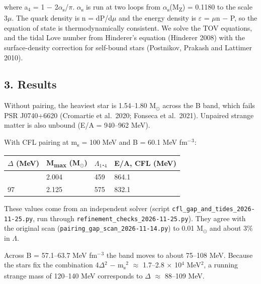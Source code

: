 \documentclass[
  11pt,
]{article}
\begin{document}
where a\ensuremath{_{4}} = 1 \ensuremath{-} 2\ensuremath{\alpha}\textsubscript{s}/\ensuremath{\pi}. \ensuremath{\alpha}\textsubscript{s} is run at two loops from \ensuremath{\alpha}\textsubscript{s}(M\textsubscript{Z}) = 0.1180 to the scale 3\ensuremath{\mu}. The quark density is n = dP/d\ensuremath{\mu} and the energy density is \ensuremath{\varepsilon} = \ensuremath{\mu}n \ensuremath{-} P, so the equation of state is thermodynamically consistent. We solve the TOV equations, and the tidal Love number from Hinderer's equation (Hinderer 2008) with the surface-density correction for self-bound stars (Postnikov, Prakash and Lattimer 2010).

\hypertarget{results}{%
\subsection{3. Results}\label{results}}

Without pairing, the heaviest star is 1.54--1.80 M\ensuremath{_{\odot}} across the B band, which fails PSR J0740+6620 (Cromartie et al.~2020; Fonseca et al.~2021). Unpaired strange matter is also unbound (E/A = 940--962 MeV).

With CFL pairing at m\textsubscript{s} = 100 MeV and B = 60.1 MeV fm\ensuremath{^{-}}\ensuremath{^{3}}:

\begin{longtable}[]{@{}llll@{}}
\toprule\noalign{}
\ensuremath{\Delta} (MeV) & M\textsubscript{max} (M\ensuremath{_{\odot}}) & \ensuremath{\Lambda}\ensuremath{_{1}}.\ensuremath{_{4}} & E/A, CFL (MeV) \\
\midrule\noalign{}
\endhead
\bottomrule\noalign{}
\endlastfoot
82 & 2.004 & 459 & 864.1 \\
97 & 2.125 & 575 & 832.1 \\
\end{longtable}

These values come from an independent solver (script \texttt{cfl\_gap\_and\_tides\_2026-11-25.py}, run through \texttt{refinement\_checks\_2026-11-25.py}). They agree with the original scan (\texttt{pairing\_gap\_scan\_2026-11-14.py}) to 0.01 M\ensuremath{_{\odot}} and about 3\% in \ensuremath{\Lambda}.

Across B = 57.1--63.7 MeV fm\ensuremath{^{-}}\ensuremath{^{3}} the band moves to about 75--108 MeV. Because the stars fix the combination 4\ensuremath{\Delta}\ensuremath{^{2}} \ensuremath{-} m\textsubscript{s}\ensuremath{^{2}} \ensuremath{\approx} 1.7--2.8 \ensuremath{\times} 10\ensuremath{^{4}} MeV\ensuremath{^{2}}, a running strange mass of 120--140 MeV corresponds to \ensuremath{\Delta} \ensuremath{\approx} 88--109 MeV.
\end{document}
